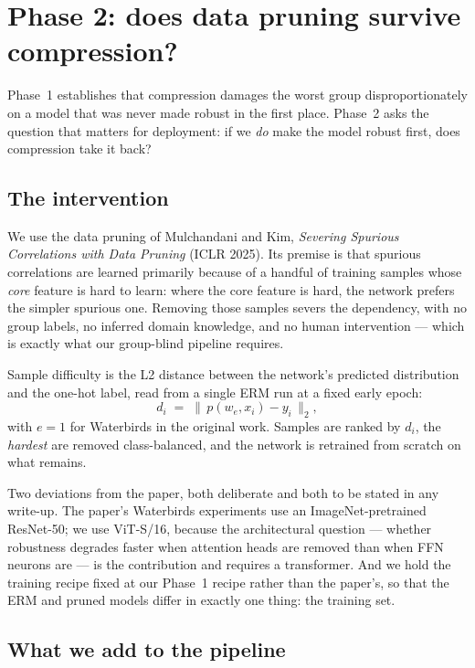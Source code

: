 \documentclass[11pt]{article}
\begin{document}
\section{Phase 2: does data pruning survive compression?}

Phase~1 establishes that compression damages the worst group disproportionately
on a model that was never made robust in the first place. Phase~2 asks the
question that matters for deployment: if we \emph{do} make the model robust
first, does compression take it back?

\subsection{The intervention}

We use the data pruning of Mulchandani and Kim, \emph{Severing Spurious
Correlations with Data Pruning} (ICLR 2025). Its premise is that spurious
correlations are learned primarily because of a handful of training samples whose
\emph{core} feature is hard to learn: where the core feature is hard, the network
prefers the simpler spurious one. Removing those samples severs the dependency,
with no group labels, no inferred domain knowledge, and no human intervention ---
which is exactly what our group-blind pipeline requires.

Sample difficulty is the L2 distance between the network's predicted distribution
and the one-hot label, read from a single ERM run at a fixed early epoch:
\[
  d_i \;=\; \bigl\lVert\, p(w_e, x_i) - y_i \,\bigr\rVert_2 ,
\]
with $e = 1$ for Waterbirds in the original work. Samples are ranked by $d_i$, the
\emph{hardest} are removed class-balanced, and the network is retrained from
scratch on what remains.

Two deviations from the paper, both deliberate and both to be stated in any
write-up. The paper's Waterbirds experiments use an ImageNet-pretrained
ResNet-50; we use ViT-S/16, because the architectural question --- whether
robustness degrades faster when attention heads are removed than when FFN neurons
are --- is the contribution and requires a transformer. And we hold the training
recipe fixed at our Phase~1 recipe rather than the paper's, so that the ERM and
pruned models differ in exactly one thing: the training set.

\subsection{What we add to the pipeline}
\end{document}
